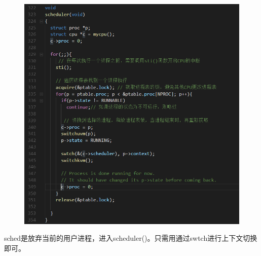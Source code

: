 \documentclass[a4paper,12pt]{report}
\begin{document}
\begin{figure}[H]
	\centering
	\includegraphics [width=1.0\textwidth]{figure//image105.png}
\end{figure}


sched是放弃当前的用户进程，进入scheduler()。只需用通过swtch进行上下文切换即可。
\end{document}
